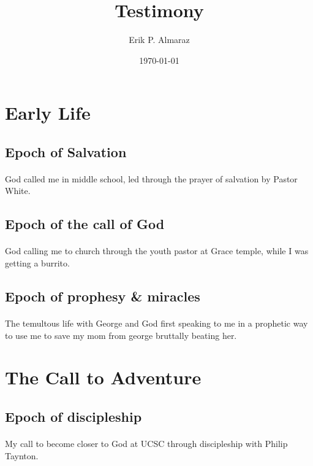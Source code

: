 \documentclass[a4paper]{article}
\author{Erik P. Almaraz}
\date{\today}
\title{Testimony}
\begin{document}
\maketitle
\tableofcontents


\section{Early Life}
\label{sec:org281620c}
\subsection{Epoch of Salvation}
\label{sec:org6b35bd7}
\paragraph{}
God called me in middle school, led through the prayer of salvation by Pastor White.

\subsection{Epoch of the call of God}
\label{sec:orgc37fc76}
\paragraph{}
God calling me to church through the youth pastor at Grace temple, while I was getting a burrito.

\subsection{Epoch of prophesy \& miracles}
\label{sec:org3335d0a}
\paragraph{}
The temultous life with George and God first speaking to me in a prophetic way to use me to save my mom from
george bruttally beating her.


\section{The Call to Adventure}
\label{sec:org94ef96d}
\subsection{Epoch of discipleship}
\label{sec:orgef805f6}
\paragraph{}
My call to become closer to God at UCSC through discipleship with Philip Taynton.
\end{document}
